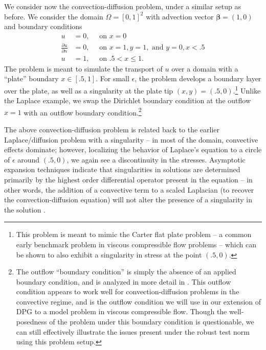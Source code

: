 \documentclass[letterpaper]{article}
\def\bbeta{\boldsymbol\beta}
\newcommand{\pd}[2]{\frac{\partial#1}{\partial#2}}
\begin{document}
We consider now the convection-diffusion problem, under a similar setup as
before.  We consider the domain $\Omega = [0,1]^2$ with advection vector
$\bbeta=(1,0)$ and boundary conditions
\begin{align*}
u &= 0,\quad \text{ on } x = 0\\
\pd{u}{n} &= 0,\quad \text{ on } x = 1, y = 1, \text{ and } y = 0, x < .5\\
u &= 1,\quad \text{ on } .5 < x \leq 1.
\end{align*}
The problem is meant to simulate the transport of $u$ over a domain with a
``plate'' boundary $x \in [.5,1]$.  For small $\epsilon$, the problem develops
a boundary layer over the plate, as well as a singularity at the plate tip
$(x,y) = (.5,0)$.\footnote{This problem is meant to mimic the Carter flat
plate problem -- a common early benchmark problem in viscous compressible flow
problems -- which can be shown to also exhibit a singularity in stress at the
point $(.5,0)$.}  Unlike the Laplace example, we swap the Dirichlet boundary
condition at the outflow $x=1$ with an outflow boundary
condition.\footnote{The outflow ``boundary condition'' is simply the absence
of an applied boundary condition, and is analyzed in more detail in
\cite{FLD:FLD505}.  This outflow condition appears to work well for
convection-diffusion problems in the convective regime, and is the outflow
condition we will use in our extension of DPG to a model problem in viscous
compressible flow.  Though the well-posedness of the problem under this
boundary condition is questionable, we can still effectively illustrate the
issues present under the robust test norm using this problem setup.  }

The above convection-diffusion problem is related back to the earlier
Laplace/diffusion problem with a singularity -- in most of the domain,
convective effects dominate; however, localizing the behavior of
Laplace's equation to a circle of $\epsilon$ around $(.5,0)$, we again
see a discontinuity in the stresses.  Asymptotic expansion techniques indicate
that singularities in solutions are determined primarily by the highest order
differential operator present in the equation -- in other words, the addition
of a convective term to a scaled Laplacian (to recover the
convection-diffusion equation) will not alter the presence of a singularity in
the solution \cite{roos2008robust}.
\end{document}

